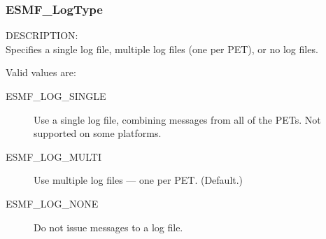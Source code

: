 \subsubsection{ESMF\_LogType}

\label{opt:logtype}
{\sf DESCRIPTION:\\}
Specifies a single log file, multiple log files (one per PET), or no log files.

Valid values are:
\begin{description}
   \item [ESMF\_LOG\_SINGLE] 
         Use a single log file, combining messages from all of the PETs.  Not supported on some platforms.
   \item [ESMF\_LOG\_MULTI]
         Use multiple log files --- one per PET.  (Default.)
   \item [ESMF\_LOG\_NONE]
         Do not issue messages to a log file.
\end{description}





